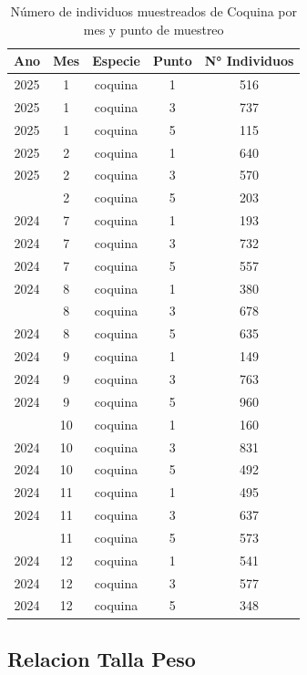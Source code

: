 \documentclass[
]{article}
\begin{document}
\begin{table}

\caption{\label{tab:unnamed-chunk-10}Número de individuos muestreados de Coquina por mes y punto de muestreo}
\centering
\begin{tabular}[t]{ccccc}
\toprule
Ano & Mes & Especie & Punto & N° Individuos\\
\midrule
2025 & 1 & coquina & 1 & 516\\
2025 & 1 & coquina & 3 & 737\\
2025 & 1 & coquina & 5 & 115\\
2025 & 2 & coquina & 1 & 640\\
2025 & 2 & coquina & 3 & 570\\
\addlinespace
2025 & 2 & coquina & 5 & 203\\
2024 & 7 & coquina & 1 & 193\\
2024 & 7 & coquina & 3 & 732\\
2024 & 7 & coquina & 5 & 557\\
2024 & 8 & coquina & 1 & 380\\
\addlinespace
2024 & 8 & coquina & 3 & 678\\
2024 & 8 & coquina & 5 & 635\\
2024 & 9 & coquina & 1 & 149\\
2024 & 9 & coquina & 3 & 763\\
2024 & 9 & coquina & 5 & 960\\
\addlinespace
2024 & 10 & coquina & 1 & 160\\
2024 & 10 & coquina & 3 & 831\\
2024 & 10 & coquina & 5 & 492\\
2024 & 11 & coquina & 1 & 495\\
2024 & 11 & coquina & 3 & 637\\
\addlinespace
2024 & 11 & coquina & 5 & 573\\
2024 & 12 & coquina & 1 & 541\\
2024 & 12 & coquina & 3 & 577\\
2024 & 12 & coquina & 5 & 348\\
\bottomrule
\end{tabular}
\end{table}

\hypertarget{relacion-talla-peso}{%
\subsection{Relacion Talla Peso}\label{relacion-talla-peso}}
\end{document}
